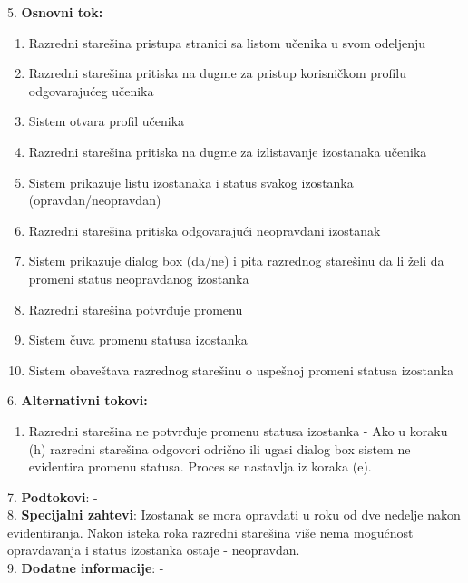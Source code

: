 \documentclass{article}
\begin{document}
5. \textbf{Osnovni tok:} 
\begin{enumerate} [label=(\alph*)]
\item Razredni starešina pristupa stranici sa listom učenika u svom odeljenju
\item Razredni starešina pritiska na dugme za pristup korisničkom profilu odgovarajućeg učenika
\item Sistem otvara profil učenika
\item Razredni starešina pritiska na dugme za izlistavanje izostanaka učenika
\item Sistem prikazuje listu izostanaka i status svakog izostanka (opravdan/neopravdan)
\item Razredni starešina pritiska odgovarajući neopravdani izostanak
\item Sistem prikazuje dialog box (da/ne) i pita razrednog starešinu da li želi da promeni status neopravdanog izostanka
\item Razredni starešina potvrđuje promenu
\item Sistem čuva promenu statusa izostanka
\item Sistem obaveštava razrednog starešinu o uspešnoj promeni statusa izostanka
\end{enumerate}

6. \textbf{Alternativni tokovi:}
\begin{enumerate} [label=(\roman*)]
\item Razredni starešina ne potvrđuje promenu statusa izostanka - Ako u koraku (h) razredni starešina odgovori odrično ili ugasi dialog box sistem ne evidentira promenu statusa. Proces se nastavlja iz koraka (e). 
\end{enumerate}

7. \textbf{Podtokovi}: - \\

8. \textbf{Specijalni zahtevi}: Izostanak se mora opravdati u roku od dve nedelje nakon evidentiranja. Nakon isteka roka razredni starešina više nema mogućnost opravdavanja i status izostanka ostaje - neopravdan. \\

9. \textbf{Dodatne informacije}: - \\
\end{document}
